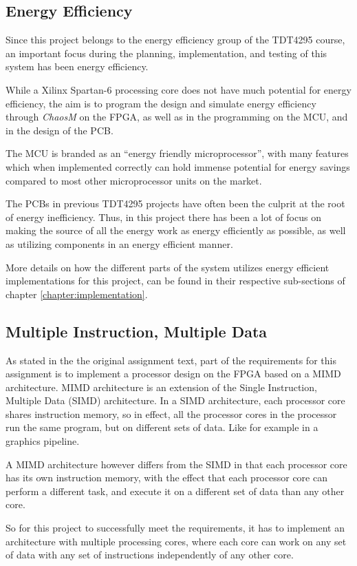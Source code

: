 \subsection{Energy Efficiency}
Since this project belongs to the energy efficiency group of the TDT4295 course,
an important focus during the planning, implementation, and testing of this system
has been energy efficiency.

While a Xilinx Spartan-6\cite{fpga-chip} processing core does not have much
potential for energy efficiency, the aim is to program the design and simulate
energy efficiency through \textit{ChaosM} on the FPGA, as well as in the
programming on the MCU, and in the design of the PCB.

The MCU is branded as an ``energy friendly microprocessor'', with many features
which when implemented correctly can hold immense potential for energy savings
compared to most other microprocessor units on the market.

The PCBs in previous TDT4295 projects have often been the culprit at the root of
energy inefficiency. Thus, in this project there has been a lot of focus on making
the source of all the energy work as energy efficiently as possible, as well as
utilizing components in an energy efficient manner.

More details on how the different parts of the system utilizes energy efficient
implementations for this project, can be found in their respective sub-sections
of chapter \ref{chapter:implementation}.

\subsection{Multiple Instruction, Multiple Data}

As stated in the the original assignment text, part of the requirements for this
assignment is to implement a processor design on the FPGA based on a MIMD
architecture. MIMD architecture is an extension of the Single Instruction,
Multiple Data (SIMD) architecture. In a SIMD architecture, each processor core
shares instruction memory, so in effect, all the processor cores in the
processor run the same program, but on different sets of data. Like for example
in a graphics pipeline.

A MIMD architecture however differs from the SIMD in that each processor core
has its own instruction memory, with the effect that each processor core can
perform a different task, and execute it on a different set of data than any
other core.

So for this project to successfully meet the requirements, it has to implement
an architecture with multiple processing cores, where each core can work on any
set of data with any set of instructions independently of any other core.
